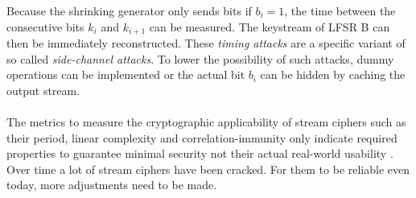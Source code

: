 Because the shrinking generator only sends bits if $b_i=1$, the time between the consecutive bits $k_i$ and $k_{i+1}$ can be measured. The keystream of LFSR B can then be immediately reconstructed. These \emph{timing attacks} are a specific variant of so called \emph{side-channel attacks}. To lower the possibility of such attacks, dummy operations can be implemented or the actual bit $b_i$ can be hidden by caching the output stream. \cite[pp. 163-164]{Klein.2013} \\\\

The metrics to measure the cryptographic applicability of stream ciphers such as their period, linear complexity and correlation-immunity only indicate required properties to guarantee minimal security not their actual real-world usability \cite[p. 24]{coppersmith1993shrinking}. Over time a lot of stream ciphers have been cracked. For them to be reliable even today, more adjustments need to be made.

\clearpage

